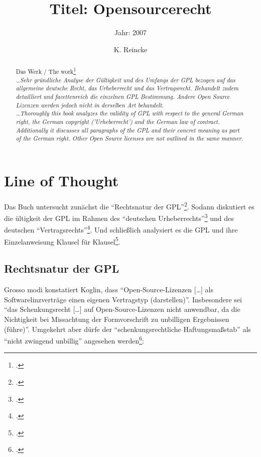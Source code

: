 \documentclass[DIV=calc,BCOR=5mm,11pt,headings=small,oneside,abstract=true, toc=bib]{scrartcl}
\begin{document}

\titlehead{Literaturexzerpt}
\subject{Autor(en): Koglin}
\title{Titel: Opensourcerecht}
\subtitle{Jahr: 2007 }
\author{K. Reincke}

\maketitle

\begin{abstract}
\noindent
Das Werk / The work\footcite[][]{Koglin2007a} \\
\noindent \itshape
\ldots Sehr gründliche Analyse der Gültigkeit und des Umfangs der GPL bezogen
auf das allgemeine deutsche Recht, das Urheberrecht und das Vertragsrecht.
Behandelt zudem detailliert und facettenreich die einzelnen GPL Bestimmung.
Andere Open Source Lizenzen werden jedoch nicht in derselben Art behandelt.\\
\noindent
\ldots Thoroughly this book analyzes the validity of GPL with respect to the
general German right, the German copyright ('Urheberrecht') and the German law
of contract. Additionally it discusses all paragraphs of the GPL and their
concret meaning as part of the German right. Other Open Source licenses are not
outlined in the same manner.
\end{abstract}
\footnotesize
\normalsize

\section{Line of Thought}

Das Buch untersucht zunächst die \enquote{Rechtsnatur der
GPL}\footcite[vgl.][21ff]{Koglin2007a}. Sodann diskutiert es die
ültigkeit der GPL im Rahmen des \enquote{deutschen
Urheberrechts}\footcite[vgl.][65ff]{Koglin2007a} und des deutschen
\enquote{Vertragsrechts}\footcite[vgl.][135ff]{Koglin2007a}. Und schließlich
analysiert es die GPL und ihre Einzelanweisung Klausel für
Klausel\footcite[vgl.][185ff]{Koglin2007a}.

\subsection{Rechtsnatur der GPL}

Grosso modi konstatiert Koglin, dass \enquote{Open-Source-Lizenzen [\ldots] als
Softwarelinzverträge einen eigenen Vertragstyp (darstellen)}.
Insbesondere sei \enquote{das Schenkungsrecht [\ldots] auf Open-Source-Lizenzen nicht
anwendbar, da die Nichtigkeit bei Missachtung der Formvorschrift zu
unbilligen Ergebnissen (führe)}. Umgekehrt aber dürfe der
\enquote{schenkungsrechtliche Haftungsmaßstab} als \enquote{nicht zwingend
unbillig} angesehen werden\footcite[vgl.][63]{Koglin2007a}:
\end{document}
